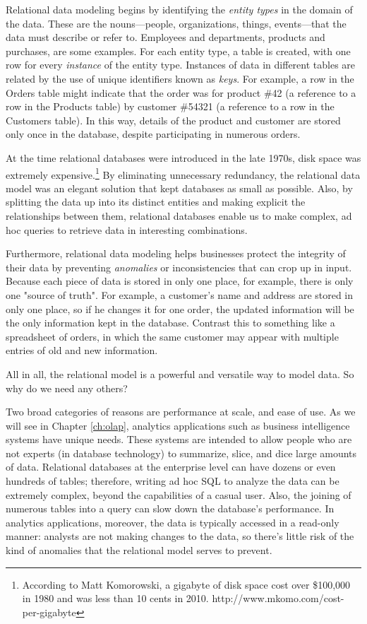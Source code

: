\documentclass[11pt]{book}
\newcommand{\term}[1]{\emph{#1}} %
\begin{document}
Relational data modeling begins by identifying the \term{entity types} in the domain of the data.  These are the nouns---people, organizations, things, events---that the data must describe or refer to.  Employees and departments, products and purchases, are some examples.  For each entity type, a table is created, with one row for every \term{instance} of the entity type.  Instances of data in different tables are related by the use of unique identifiers known as \term{keys}.  For example, a row in the Orders table might indicate that the order was for product \#42 (a reference to a row in the Products table) by customer \#54321 (a reference to a row in the Customers table).  In this way, details of the product and customer are stored only once in the database, despite participating in numerous orders.

At the time relational databases were introduced in the late 1970s, disk space was extremely expensive.\footnote{According to Matt Komorowski, a gigabyte of disk space cost over \$100,000 in 1980 and was less than 10 cents in 2010. http://www.mkomo.com/cost-per-gigabyte}  By eliminating unnecessary redundancy, the relational data model was an elegant solution that kept databases as small as possible.  Also, by splitting the data up into its distinct entities and making explicit the relationships between them, relational databases enable us to make complex, ad hoc queries to retrieve data in interesting combinations.  

Furthermore, relational data modeling helps businesses protect the integrity of their data by preventing \term{anomalies} or inconsistencies that can crop up in input.  Because each piece of data is stored in only one place, for example, there is only one "source of truth".  For example, a customer's name and address are stored in only one place, so if he changes it for one order, the updated information will be the only information kept in the database.  Contrast this to something like a spreadsheet of orders, in which the same customer may appear with multiple entries of old and new information.

All in all, the relational model is a powerful and versatile way to model data.  So why do we need any others?  

Two broad categories of reasons are performance at scale, and ease of use.  As we will see in Chapter \ref{ch:olap}, analytics applications such as business intelligence systems have unique needs.  These systems are intended to allow people who are not experts (in database technology) to summarize, slice, and dice large amounts of data.  Relational databases at the enterprise level can have dozens or even hundreds of tables; therefore, writing ad hoc SQL to analyze the data can be extremely complex, beyond the capabilities of a casual user.  Also, the joining of numerous tables into a query can slow down the database's performance.  In analytics applications, moreover, the data is typically accessed in a read-only manner: analysts are not making changes to the data, so there's little risk of the kind of anomalies that the relational model serves to prevent.
\end{document}
